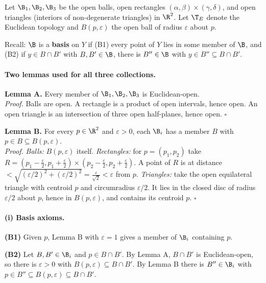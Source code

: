 
Let $\B_1,\B_2,\B_3$ be the open balls, open rectangles $(\alpha,\beta)\times(\gamma,\delta)$,
and open triangles (interiors of non-degenerate triangles) in $\R^2$. Let $\T_E$ denote the
Euclidean topology and $B(p,\varepsilon)$ the open ball of radius $\varepsilon$ about $p$.

Recall: $\B$ is a \textbf{basis} on $Y$ if (B1) every point of $Y$ lies in some member of
$\B$, and (B2) if $y\in B\cap B'$ with $B,B'\in\B$, there is $B''\in\B$ with
$y\in B''\subseteq B\cap B'$.

\paragraph{Two lemmas used for all three collections.}

\textbf{Lemma A.} Every member of $\B_1,\B_2,\B_3$ is Euclidean-open.\\
\emph{Proof.} Balls are open. A rectangle is a product of open intervals, hence open. An open
triangle is an intersection of three open half-planes, hence open. $\square$

\textbf{Lemma B.} For every $p\in\R^2$ and $\varepsilon>0$, each $\B_i$ has a member $B$ with
$p\in B\subseteq B(p,\varepsilon)$.\\
\emph{Proof.} \emph{Balls:} $B(p,\varepsilon)$ itself. \emph{Rectangles:} for $p=(p_1,p_2)$
take
$R=(p_1-\tfrac\varepsilon2,p_1+\tfrac\varepsilon2)\times(p_2-\tfrac\varepsilon2,p_2+\tfrac\varepsilon2)$.
A point of $R$ is at distance
$<\sqrt{(\varepsilon/2)^2+(\varepsilon/2)^2}=\tfrac{\varepsilon}{\sqrt2}<\varepsilon$ from
$p$. \emph{Triangles:} take the open equilateral triangle with centroid $p$ and circumradius
$\varepsilon/2$. It lies in the closed disc of radius $\varepsilon/2$ about $p$, hence in
$B(p,\varepsilon)$, and contains its centroid $p$. $\square$

\paragraph{(i) Basis axioms.}
\textbf{(B1)} Given $p$, Lemma B with $\varepsilon=1$ gives a member of $\B_i$ containing $p$.

\textbf{(B2)} Let $B,B'\in\B_i$ and $p\in B\cap B'$. By Lemma A, $B\cap B'$ is Euclidean-open,
so there is $\varepsilon>0$ with $B(p,\varepsilon)\subseteq B\cap B'$. By Lemma B there is
$B''\in\B_i$ with $p\in B''\subseteq B(p,\varepsilon)\subseteq B\cap B'$.

